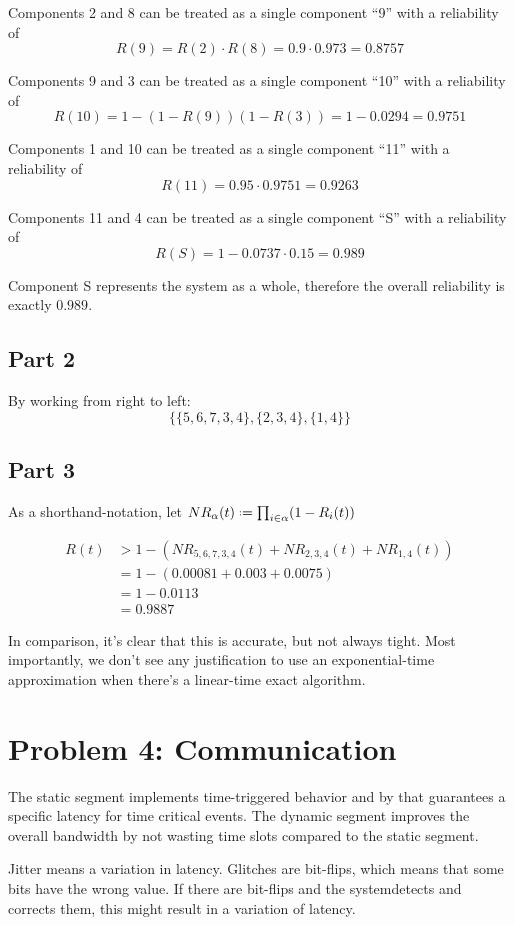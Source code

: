 \documentclass[a4paper,parskip,headheight=38pt]{scrartcl} %
\newcommand{\defeq}{\mathrel{\vcenter{\baselineskip0.5ex \lineskiplimit0pt
                    \hbox{\scriptsize.}\hbox{\scriptsize.}}}%
                    =}
\begin{document}
Components 2 and 8 can be treated as a single component \enquote{9} with a reliability of
\[R(9) = R(2) \cdot R(8) = 0.9 \cdot 0.973 = 0.8757\]

Components 9 and 3 can be treated as a single component \enquote{10} with a reliability of
\[R(10) = 1 - (1 - R(9))(1 - R(3)) = 1 - 0.0294 = 0.9751\]

Components 1 and 10 can be treated as a single component \enquote{11} with a reliability of
\[R(11) = 0.95 \cdot 0.9751 = 0.9263\]

Components 11 and 4 can be treated as a single component \enquote{S} with a reliability of
\[R(S) = 1 - 0.0737 \cdot 0.15 = 0.989\]

Component S represents the system as a whole, therefore the overall reliability is exactly $0.989$.

\subsection*{Part 2}

By working from right to left:
\[\{  \{5,6,7,3,4\}, \{2,3,4\}, \{1,4\}  \}\]

\subsection*{Part 3}

As a shorthand-notation, let $NR_{\alpha}(t) \defeq \prod_{i \in \alpha} (1-R_{i}(t))$

\begin{align*}
    R(t)
    &> 1-\left( NR_{5,6,7,3,4}(t) + NR_{2,3,4}(t) + NR_{1,4}(t) \right) \\
    &= 1-\left( 0.00081 + 0.003 + 0.0075 \right) \\
    &= 1 - 0.0113 \\
    &= 0.9887
\end{align*}

In comparison, it's clear that this is accurate, but not always tight.  Most
importantly, we don't see any justification to use an exponential-time
approximation when there's a linear-time exact algorithm.


\section*{Problem 4: Communication}
The static segment implements time-triggered behavior and by that guarantees a specific latency for time critical events. The dynamic segment improves the overall bandwidth by not wasting time slots compared to the static segment.

Jitter means a variation in latency. Glitches are bit-flips, which means that some bits have the wrong value. If there are bit-flips and the systemdetects and corrects them, this might result in a variation of latency.
\end{document}
